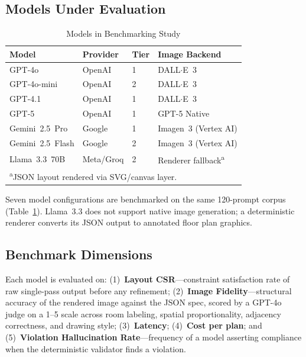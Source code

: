 \documentclass[journal]{IEEEtran}
\begin{document}
\subsection{Models Under Evaluation}

\begin{table}[t]
\centering
\caption{Models in Benchmarking Study}
\label{tab:benchmark_models}
\scriptsize
\setlength{\tabcolsep}{4pt}
\renewcommand{\arraystretch}{1.2}
\begin{tabular}{lllp{2.0cm}}
\toprule
\textbf{Model} & \textbf{Provider} & \textbf{Tier}
              & \textbf{Image Backend} \\
\midrule
GPT-4o           & OpenAI    & 1 & DALL$\cdot$E~3            \\
GPT-4o-mini      & OpenAI    & 2 & DALL$\cdot$E~3            \\
GPT-4.1          & OpenAI    & 1 & DALL$\cdot$E~3            \\
GPT-5            & OpenAI    & 1 & GPT-5 Native              \\
Gemini~2.5~Pro   & Google    & 1 & Imagen~3 (Vertex AI)      \\
Gemini~2.5~Flash & Google    & 2 & Imagen~3 (Vertex AI)      \\
Llama~3.3~70B    & Meta/Groq & 2 & Renderer fallback\textsuperscript{a} \\
\bottomrule
\multicolumn{4}{l}{\textsuperscript{a}JSON layout rendered via SVG/canvas layer.}
\end{tabular}
\end{table}

Seven model configurations are benchmarked on the same 120-prompt corpus
(Table~\ref{tab:benchmark_models}). Llama~3.3 does not support native image
generation; a deterministic renderer converts its JSON output to annotated
floor plan graphics.

\subsection{Benchmark Dimensions}

Each model is evaluated on: (1)~\textbf{Layout CSR}---constraint satisfaction
rate of raw single-pass output before any refinement; (2)~\textbf{Image
Fidelity}---structural accuracy of the rendered image against the JSON spec,
scored by a GPT-4o judge on a 1--5 scale across room labeling, spatial
proportionality, adjacency correctness, and drawing style;
(3)~\textbf{Latency}; (4)~\textbf{Cost per plan}; and
(5)~\textbf{Violation Hallucination Rate}---frequency of a model asserting
compliance when the deterministic validator finds a violation.
\end{document}
